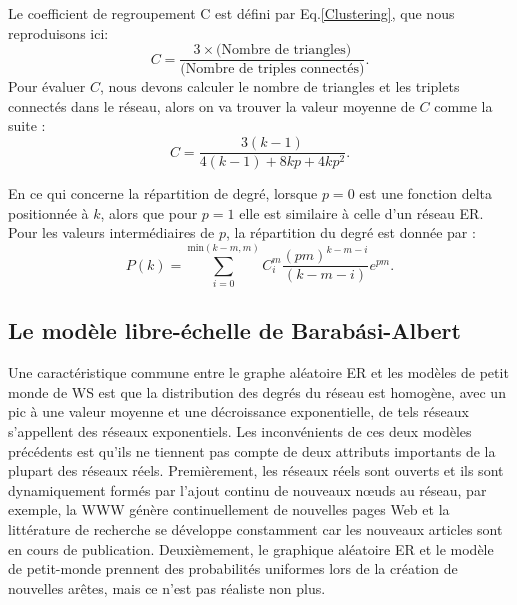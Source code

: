    Le coefficient de regroupement C est défini par Eq.\ref{Clustering}, que nous reproduisons ici:
 \begin{equation}
 C=\frac{3\times\text{(Nombre de triangles)}}{\text{(Nombre de triples connectés)}}.
 \end{equation}  
Pour évaluer $C$, nous devons calculer le nombre de triangles et les triplets connectés dans le réseau, alors on va trouver la valeur moyenne de $C$ comme la suite \cite{Newman2010-558}:
\begin{equation}
C=\frac{3(k-1)}{4(k-1)+8kp+4kp^2}.
\end{equation}  

En ce qui concerne la répartition de degré, lorsque $p=0$ est une fonction delta positionnée à $k$, alors que pour $p=1$ elle est similaire à celle d'un réseau ER. Pour les valeurs intermédiaires de $p$, la répartition du degré est donnée par \cite{Barrat-Weigt2000}:
\begin{equation}
P(k)=\sum_{i=0}^{\text{min}(k-m,m)}C_i^m\frac{(pm)^{k-m-i}}{(k-m-i)}e^{pm}.
\end{equation} 

   \subsection{Le modèle libre-échelle de Barabási-Albert}
   
Une caractéristique commune entre le graphe aléatoire ER et les modèles de petit monde de WS est que la distribution des degrés du réseau est homogène, avec un pic à une valeur moyenne et une décroissance exponentielle, de tels réseaux s'appellent des réseaux exponentiels. Les inconvénients de ces deux modèles précédents est qu'ils ne tiennent pas compte de deux attributs importants de la plupart des réseaux réels.  Premièrement, les réseaux réels sont ouverts et ils sont dynamiquement formés par l'ajout continu de nouveaux nœuds au réseau, par exemple, la WWW génère continuellement de nouvelles pages Web et la littérature de recherche se développe constamment car les nouveaux articles sont en cours de publication. Deuxièmement, le graphique aléatoire ER et le modèle de petit-monde prennent des probabilités uniformes lors de la création de nouvelles arêtes, mais ce n'est pas réaliste non plus.

